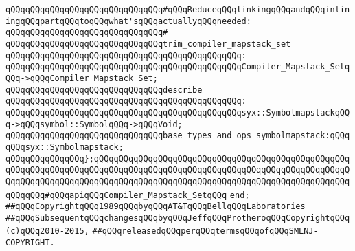 \newline
\verb|qQQqqQQqqQQqqQQqqQQqqQQqqQQqqQQq#qQQqReduceqQQqlinkingqQQqandqQQqinliningqQQqpartqQQqtoqQQqwhat'sqQQqactuallyqQQqneeded:|\newline
\verb|qQQqqQQqqQQqqQQqqQQqqQQqqQQqqQQq#|\newline
\verb|qQQqqQQqqQQqqQQqqQQqqQQqqQQqqQQqtrim_compiler_mapstack_set|\newline
\verb|qQQqqQQqqQQqqQQqqQQqqQQqqQQqqQQqqQQqqQQqqQQqqQQq:|\newline
\verb|qQQqqQQqqQQqqQQqqQQqqQQqqQQqqQQqqQQqqQQqqQQqqQQqCompiler_Mapstack_SetqQQq->qQQqCompiler_Mapstack_Set;|\newline
\newline
\verb|qQQqqQQqqQQqqQQqqQQqqQQqqQQqqQQqdescribe|\newline
\verb|qQQqqQQqqQQqqQQqqQQqqQQqqQQqqQQqqQQqqQQqqQQqqQQq:|\newline
\verb|qQQqqQQqqQQqqQQqqQQqqQQqqQQqqQQqqQQqqQQqqQQqqQQqsyx::SymbolmapstackqQQq->qQQqsymbol::SymbolqQQq->qQQqVoid;|\newline
\newline
\verb|qQQqqQQqqQQqqQQqqQQqqQQqqQQqqQQqbase_types_and_ops_symbolmapstack:qQQqqQQqsyx::Symbolmapstack;|\newline
\newline
\verb|qQQqqQQqqQQqqQQq};qQQqqQQqqQQqqQQqqQQqqQQqqQQqqQQqqQQqqQQqqQQqqQQqqQQqqQQqqQQqqQQqqQQqqQQqqQQqqQQqqQQqqQQqqQQqqQQqqQQqqQQqqQQqqQQqqQQqqQQqqQQqqQQqqQQqqQQqqQQqqQQqqQQqqQQqqQQqqQQqqQQqqQQqqQQqqQQqqQQqqQQqqQQqqQQqqQQqqQQq#qQQqapiqQQqCompiler_Mapstack_SetqQQq|\newline
\verb|end;|\newline
\newline
\newline
\newline
\verb|##qQQqCopyrightqQQq1989qQQqbyqQQqAT&TqQQqBellqQQqLaboratories|\newline
\verb|##qQQqSubsequentqQQqchangesqQQqbyqQQqJeffqQQqProtheroqQQqCopyrightqQQq(c)qQQq2010-2015,|\newline
\verb|##qQQqreleasedqQQqperqQQqtermsqQQqofqQQqSMLNJ-COPYRIGHT.|\newline

